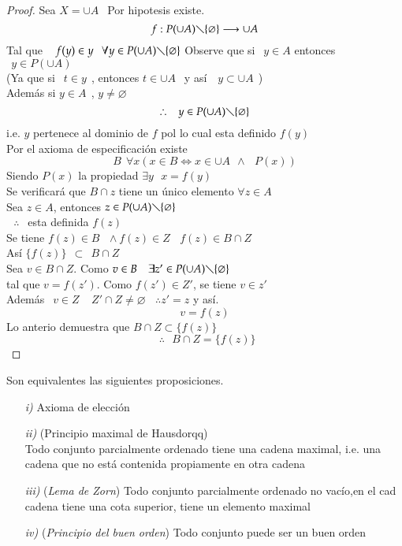 \begin{proof}
Sea $ X = \cup A \ \ $ Por hipotesis existe.
$$ f: P(\cup A ) \diagdown \lbrace \varnothing \rbrace \longrightarrow \cup A $$
Tal que $ \ \ \ f(y) \in y \ \ \  \forall y \in P(\cup A) \diagdown \lbrace \varnothing \rbrace $
Observe que si   $ \ \ y \in A $ entonces  $ \ \ y \in P( \cup A) $\\
(Ya que si $\ \  t \in y \ \  $, entonces $ t \in \cup A \ \ $ y  así  $ \ \ \ y \subset \cup A \ \  $)\\
Además  si $ y \in A \ \  $, $ y \neq \varnothing  $\\
$$ \therefore \ \ \  y \in P(\cup A) \diagdown \lbrace \varnothing \rbrace $$
i.e. $ y $ pertenece al dominio de $ f $ pol lo cual esta definido $ f(y) $  \\
Por el axioma de especificación existe 
$$ B \ \ \forall x  ( x \in B \Leftrightarrow x \in \cup A \ \  \wedge  \ \ \   P(x)) $$
Siendo $P(x)$ la propiedad $ \exists  y \ \ \ x = f(y) $\\
Se verificará que $ B \cap z  $ tiene un único elemento $ \forall z \in A $ \\
Sea  $ z \in A $, entonces $ z \in P(\cup  A) \diagdown \lbrace \varnothing \rbrace  $\\
$ \ \ \ \therefore \ \ $ esta definida $f(z) $\\
Se tiene $ f(z) \in B \ \ \ \wedge  f(z) \in Z \ \ \ \ f(z) \in B \cap Z $\\
Así $ \lbrace f(z) \rbrace  \ \ \subset \ \ B \cap Z $\\
\bigskip
Sea $ v \in B \cap Z $. Como $ v \in B  \ \  \ \  \exists z' \in P(\cup A) \diagdown \lbrace \varnothing  \rbrace $\\
tal que $ v = f(z') $. Como $ f(z') \in Z' $, se tiene $ v \in z' $\\
Además $ \  \ v \in Z \ \ \ \ \ Z' \cap Z \neq \varnothing   \ \ \ \  \therefore z'=z  $ y así.
$$ v=f(z) $$
Lo anterio demuestra que $ B \cap Z \subset \lbrace f(z) \rbrace $
$$ \ \ \therefore \ \ \  B \cap Z = \lbrace f(z) \rbrace  $$

\end{proof} 

\newpage

\begin{prop14}Son equivalentes las siguientes proposiciones.
\begin{itemize}
\item[\textit{i)}]Axioma de elección 
\item[\textit{ii)}](Principio maximal de Hausdorqq)\\
Todo conjunto parcialmente ordenado tiene una cadena maximal, i.e. una cadena que no está contenida propiamente en otra cadena

\item[\textit{iii)}](\textit{Lema de Zorn}) Todo conjunto parcialmente ordenado no vacío,en el cad cadena tiene una cota superior, tiene un elemento maximal
\item[\textit{iv)}](\textit{Principio del buen orden}) Todo conjunto puede ser un buen orden
 
\end{itemize}
\end{prop14}

